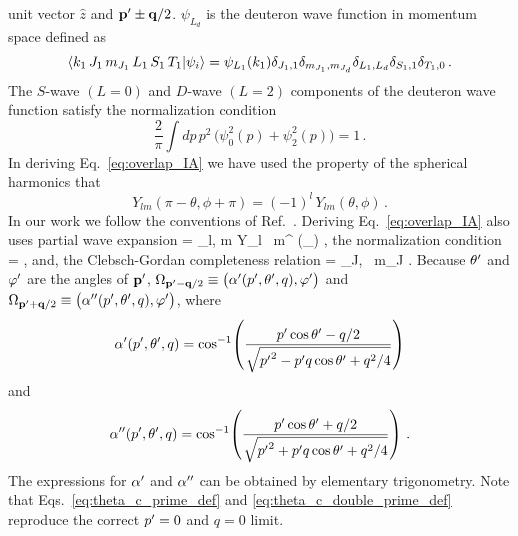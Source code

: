 	unit vector $\hat{z}$ and $\mathbf{p^\prime}\pm\mathbf{q}/2$.  $\psi_{L_d}$ is the
	deuteron wave function in momentum space defined as
	\begin{equation}
	 {\langle k_1 \, J_1 \, m_{J_1} \, L_1 \, S_1 \, T_1|\psi_i\rangle}
	 = \psi_{L_1}(k_1)
	  \delta_{J_1,1}\delta_{m_{J_1},m_{J_d}}
	 \delta_{L_1,L_d}\delta_{S_1,1}\delta_{T_1,0} \,.
  \end{equation}
	The $S$-wave $(L=0)$ and $D$-wave $(L=2)$ components of the deuteron wave
	function satisfy the normalization condition
	\begin{equation}
	 \frac{2}{\pi} \int dp \, p^2 \, \big(\psi_0^2(p) + \psi_2^2(p)\big) = 1 \,.
	\end{equation}
	In deriving Eq.~\eqref{eq:overlap_IA} we have used the property of the
	spherical harmonics that
	\begin{equation}
	 Y_{lm}(\pi-\theta,\phi+\pi) = (-1)^l \, Y_{lm}(\theta,\phi) \,.
	\end{equation}
	In our work we follow the conventions of Ref.~\cite{Landau:1989}.
	Deriving Eq.~\eqref{eq:overlap_IA} also uses partial wave expansion
	\beq
	 =  \sum_{l, m} Y_{l \, m}^\ast
	(\Omega_{})  \;,
	\eeq
	the normalization condition
	\beq
	 =   \;,
	\eeq
	and, the Clebsch-Gordan completeness relation
	\beq
	 = \sum_{J, \, m_J} 
	 \;.
	\eeq
	Because
	$\theta^{\prime}$ and $\varphi^{\prime}$ are the angles of $\mathbf{p^\prime}$, $\Omega_{\mathbf{p^\prime} -
	\mathbf{q}/2} \equiv \big(\alpha^\prime(p^\prime, \theta^{\prime}, q), \varphi^{\prime} \big)$
	and $\Omega_{\mathbf{p^\prime} + \mathbf{q}/2} \equiv
	\big(\alpha^{\prime \prime}(p^\prime, \theta^{\prime}, q),
	\varphi^{\prime} \big)$, where
	\begin{equation}
	 \alpha^\prime (p^\prime, \theta^{\prime}, q) = \cos^{-1}
	 \!\left(
	  \frac{p^\prime \cos \theta^{\prime} - q/2}{\sqrt{{p^\prime}^2 - p^\prime q \cos\theta^{\prime} + q^2/4}}
	 \right)
	\label{eq:theta_c_prime_def}
	\end{equation}
	and
	\begin{equation}
	 \alpha^{\prime \prime} (p^\prime, \theta^{\prime}, q) = \cos^{-1}
	 \!\left(
	  \frac{p^\prime \cos \theta^{\prime} + q/2}{\sqrt{{p^\prime}^2 + p^\prime q \cos\theta^{\prime} + q^2/4}}
	 \right) \,.
	\label{eq:theta_c_double_prime_def}
	\end{equation}
	The expressions for $\alpha^\prime$ and $\alpha^{\prime \prime}$ can be obtained by
	elementary trigonometry.  Note that Eqs.~\eqref{eq:theta_c_prime_def} and
	\eqref{eq:theta_c_double_prime_def} reproduce the correct $p^\prime = 0$ and
	$q = 0$ limit.

